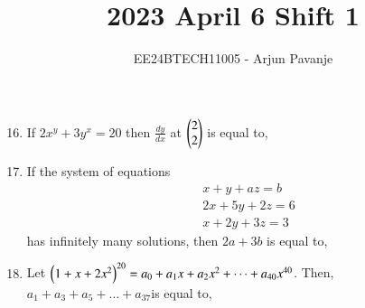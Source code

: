 \documentclass[journal]{IEEEtran}
\begin{document}

\vspace{3cm}
	
\title{2023 April 6 Shift 1}
\author{EE24BTECH11005 - Arjun Pavanje}
{\let\newpage\relax\maketitle}
\begin{enumerate}
	\setcounter{enumi}{15}
\item If $2x^y+3y^x=20$ then $\frac{dy}{dx}$ at $\begin{pmatrix}2\\2\end{pmatrix}$ is equal to,
		\begin{enumerate}
		\end{enumerate}
	\item If the system of equations
		\begin{align*}
			&x+y+az=b\\
			&2x+5y+2z=6\\
			&x+2y+3z=3
		\end{align*}
		has infinitely many solutions, then $2a+3b$ is equal to, 
		\begin{enumerate}
				\begin{multicols}{2}
					\item 28
				\columnbreak
					\item 20
				\end{multicols}
				\begin{multicols}{2}
					\item 25
				\columnbreak
					\item 23
				\end{multicols}
		\end{enumerate}
	\item Let $\left(1+x+2x^2\right)^{20}=a_0+a_1x+a_2x^2+\dots+a_{40}x^{40}$. Then, $a_1+a_3+a_5+\dots+a_{37}$is equal to,

\end{enumerate}
\end{document}
